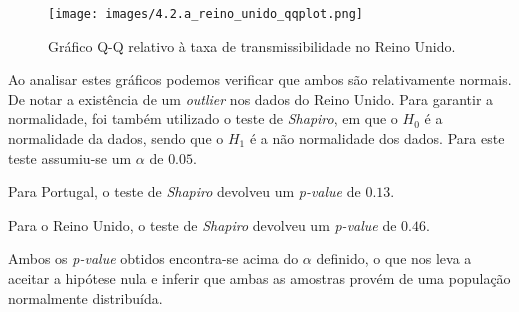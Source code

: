 \documentclass[conference]{IEEEtran}
\begin{document}
\begin{figure}[h]
    \centering
    \texttt{[image: images/4.2.a\_reino\_unido\_qqplot.png]}
    \caption{Gráfico Q-Q relativo à taxa de transmissibilidade no Reino Unido.}
    \label{fig:4.2.uk}
\end{figure}

Ao analisar estes gráficos podemos verificar que ambos são relativamente normais. De notar a existência de um \textit{outlier} nos dados do Reino Unido. Para garantir a normalidade, foi também utilizado o teste de \textit{Shapiro}, em que o $H_{0}$ é a normalidade da dados, sendo que o $H_{1}$ é a não normalidade dos dados. Para este teste assumiu-se um $\alpha$ de $0.05$.

Para Portugal, o teste de \textit{Shapiro} devolveu um \textit{p-value} de $0.13$.

Para o Reino Unido, o teste de \textit{Shapiro} devolveu um \textit{p-value} de $0.46$.

Ambos os \textit{p-value} obtidos encontra-se acima do $\alpha$ definido, o que nos leva a aceitar a hipótese nula e inferir que ambas as amostras provém de uma população normalmente distribuída.


\printbibliography
\end{document}
